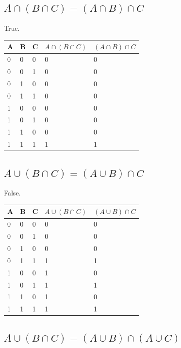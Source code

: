\documentclass[12pt]{article}
\begin{document}
\subsection{$A \cap (B \cap C) = (A \cap B) \cap C$}

True.


\begin{table}[H]
\begin{tabular}{lll|ll}
A & B & C & $A \cap (B \cap C)$ & $(A \cap B) \cap C$ \\ \hline
0 & 0 & 0 & 0         & 0         \\
0 & 0 & 1 & 0         & 0         \\
0 & 1 & 0 & 0         & 0         \\
0 & 1 & 1 & 0         & 0         \\
1 & 0 & 0 & 0         & 0         \\
1 & 0 & 1 & 0         & 0         \\
1 & 1 & 0 & 0         & 0         \\
1 & 1 & 1 & 1         & 1         \\
\end{tabular}
\end{table}

\subsection{$A \cup (B \cap C) = (A \cup B) \cap C$}

False.

\begin{table}[H]
\begin{tabular}{lll|ll}
A & B & C & $A \cup (B \cap C)$ & $(A \cup B) \cap C$ \\ \hline
0 & 0 & 0 & 0         & 0         \\
0 & 0 & 1 & 0         & 0         \\
0 & 1 & 0 & 0         & 0         \\
0 & 1 & 1 & 1         & 1         \\
1 & 0 & 0 & 1         & 0         \\
1 & 0 & 1 & 1         & 1         \\
1 & 1 & 0 & 1         & 0         \\
1 & 1 & 1 & 1         & 1         \\
\end{tabular}
\end{table}

\subsection{$A \cup (B \cap C) = (A \cup B) \cap (A \cup C)$}
\end{document}
